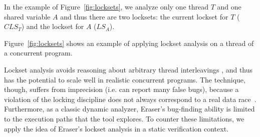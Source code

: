 In the example of Figure~\ref{fig:locksets}, we analyze only one thread $T$ and one shared variable $A$ and thus there are two locksets: the current lockset for $T$ ($CLS_T$) and the lockset for $A$ ($LS_A$). 

Figure~\ref{fig:locksets} shows an example of applying lockset analysis on a thread of a concurrent program.

Lockset analysis avoids reasoning about arbitrary thread interleavings , and thus has the potential to scale well in realistic concurrent programs. The technique, though, suffers from imprecision (i.e. can report many false bugs), because a violation of the locking discipline does not always correspond to a real data race~\cite{savage1997eraser, pozniansky2003efficient, o2003hybrid, elmas2007goldilocks, flanagan2009fasttrack}. Furthermore, as a classic dynamic analyzer, Eraser's bug-finding ability is limited to the execution paths that the tool explores.  To counter these limitations, we apply the idea of Eraser's lockset analysis in a static verification context.
